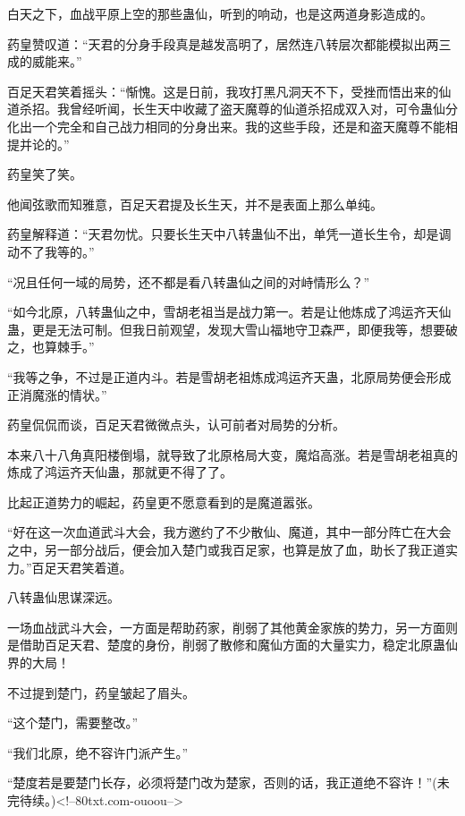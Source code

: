 \begin{this_body}
白天之下，血战平原上空的那些蛊仙，听到的响动，也是这两道身影造成的。

药皇赞叹道：“天君的分身手段真是越发高明了，居然连八转层次都能模拟出两三成的威能来。”

百足天君笑着摇头：“惭愧。这是日前，我攻打黑凡洞天不下，受挫而悟出来的仙道杀招。我曾经听闻，长生天中收藏了盗天魔尊的仙道杀招成双入对，可令蛊仙分化出一个完全和自己战力相同的分身出来。我的这些手段，还是和盗天魔尊不能相提并论的。”

药皇笑了笑。

他闻弦歌而知雅意，百足天君提及长生天，并不是表面上那么单纯。

药皇解释道：“天君勿忧。只要长生天中八转蛊仙不出，单凭一道长生令，却是调动不了我等的。”

“况且任何一域的局势，还不都是看八转蛊仙之间的对峙情形么？”

“如今北原，八转蛊仙之中，雪胡老祖当是战力第一。若是让他炼成了鸿运齐天仙蛊，更是无法可制。但我日前观望，发现大雪山福地守卫森严，即便我等，想要破之，也算棘手。”

“我等之争，不过是正道内斗。若是雪胡老祖炼成鸿运齐天蛊，北原局势便会形成正消魔涨的情状。”

药皇侃侃而谈，百足天君微微点头，认可前者对局势的分析。

本来八十八角真阳楼倒塌，就导致了北原格局大变，魔焰高涨。若是雪胡老祖真的炼成了鸿运齐天仙蛊，那就更不得了了。

比起正道势力的崛起，药皇更不愿意看到的是魔道嚣张。

“好在这一次血道武斗大会，我方邀约了不少散仙、魔道，其中一部分阵亡在大会之中，另一部分战后，便会加入楚门或我百足家，也算是放了血，助长了我正道实力。”百足天君笑着道。

八转蛊仙思谋深远。

一场血战武斗大会，一方面是帮助药家，削弱了其他黄金家族的势力，另一方面则是借助百足天君、楚度的身份，削弱了散修和魔仙方面的大量实力，稳定北原蛊仙界的大局！

不过提到楚门，药皇皱起了眉头。

“这个楚门，需要整改。”

“我们北原，绝不容许门派产生。”

“楚度若是要楚门长存，必须将楚门改为楚家，否则的话，我正道绝不容许！”(未完待续。)<!--80txt.com-ouoou-->

\end{this_body}

